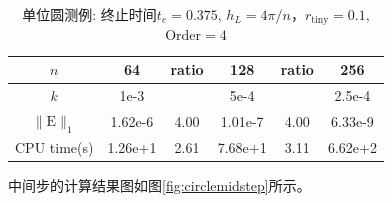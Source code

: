 \documentclass[a4paper,twoside]{ctexart}
\begin{document}
  \begin{table}[htbp]
    \centering\begin{tabular}{c|ccccc}
        \hline
         $n$&64&ratio&128&ratio&256\\
                \hline
         $k$&1e-3&&5e-4&&2.5e-4\\
        \hline
        $\|\mathrm{E}\|_1$&1.62e-6&4.00&1.01e-7&4.00&6.33e-9\\
        \hline
        CPU time(s)&1.26e+1&2.61&7.68e+1&3.11&6.62e+2\\
        \hline
      \end{tabular}
    \caption{单位圆测例: 终止时间$t_e = 0.375$, $h_L=4\pi/n$，$r_{\text{tiny}}=0.1$,
      $\text{Order} = 4$}
    \label{tab:circle2}
  \end{table}
  中间步的计算结果图如图\ref{fig:circlemidstep}所示。
\end{document}
